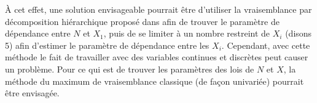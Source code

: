 \documentclass{article}
\begin{document}
	 À cet effet, une solution envisageable pourrait être d'utiliser la vraisemblance par décomposition hiérarchique proposé dans \cite{LikelyhoodEstimation} afin de trouver le paramètre de dépendance entre $N$ et $X_1$, puis de se limiter à un nombre restreint de $X_i$ (disons 5) afin d'estimer le paramètre de dépendance entre les $X_i$. Cependant, avec cette méthode le fait de travailler avec des variables continues et discrètes peut causer un problème. Pour ce qui est de trouver les paramètres des lois de $N$ et $X$, la méthode du maximum de vraisemblance classique (de façon univariée) pourrait être envisagée.
 
	
	\clearpage
	
	
\end{document}
